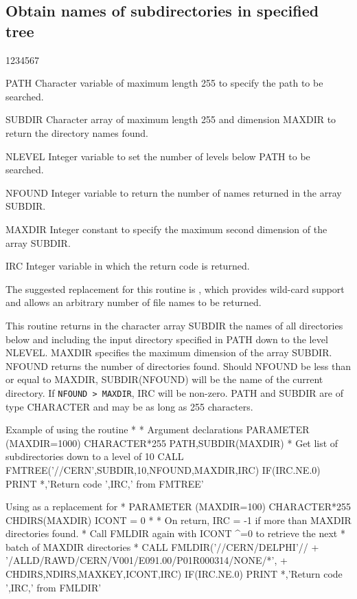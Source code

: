 \subsection{Obtain names of subdirectories in specified tree}
\begin{DLtt}{1234567}
\item[PATH]
Character variable of maximum length 255 to specify the path to be
searched.
\item[SUBDIR]
Character array of maximum length 255 and dimension MAXDIR
to return the directory names found.
\item[NLEVEL]
Integer variable to set the number of levels below PATH to
be searched.
\item[NFOUND]
Integer variable to return the number of names returned in
the array SUBDIR.
\item[MAXDIR]
Integer constant to specify the maximum second dimension of
the array SUBDIR.
\item[IRC]
Integer variable in which the return code is returned.
\end{DLtt}
\par
The suggested replacement for this routine is , which 
provides wild-card support and
allows an arbitrary number of file names to be returned.
\par
This routine returns in the character array SUBDIR the names of
all directories below and including the input directory specified
in PATH down to the level NLEVEL.
MAXDIR specifies the maximum dimension of the array SUBDIR.
NFOUND returns the number of directories found.
Should NFOUND be less than or equal to MAXDIR, SUBDIR(NFOUND) will
be the name of the current directory.
If {\tt NFOUND > MAXDIR}, IRC will be non-zero.
PATH and SUBDIR are of type CHARACTER and may be as long as 255
characters.
\begin{XMPt}{Example of using the \protect{} routine}
*
*     Argument declarations
      PARAMETER     (MAXDIR=1000)
      CHARACTER*255 PATH,SUBDIR(MAXDIR)
*     Get list of subdirectories down to a level of 10
      CALL FMTREE('//CERN',SUBDIR,10,NFOUND,MAXDIR,IRC)
      IF(IRC.NE.0) PRINT *,'Return code ',IRC,' from FMTREE'
\end{XMPt}
\begin{XMPt}{Using \protect{} as a replacement for \protect{}}
*
      PARAMETER     (MAXDIR=100)
      CHARACTER*255  CHDIRS(MAXDIR)
      ICONT = 0
*
*     On return, IRC = -1 if more than MAXDIR directories found.
*     Call FMLDIR again with ICONT ^=0 to retrieve the next
*     batch of MAXDIR directories
* 
      CALL FMLDIR('//CERN/DELPHI'//
     +            '/ALLD/RAWD/CERN/V001/E091.00/P01R000314/NONE/*',
     +            CHDIRS,NDIRS,MAXKEY,ICONT,IRC)
      IF(IRC.NE.0) PRINT *,'Return code ',IRC,' from FMLDIR'
\end{XMPt}

